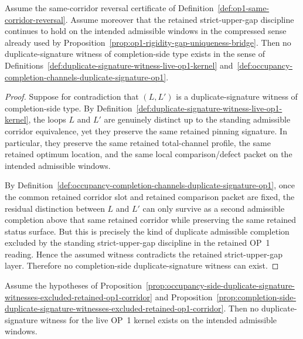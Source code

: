 \begin{proposition}
\label{prop:completion-side-duplicate-signature-witnesses-excluded-retained-op1-corridor}
Assume the same-corridor reversal certificate of Definition~\ref{def:op1-same-corridor-reversal}. Assume moreover that the retained strict-upper-gap discipline continues to hold on the intended admissible windows in the compressed sense already used by Proposition~\ref{prop:op1-rigidity-gap-uniqueness-bridge}. Then no duplicate-signature witness of completion-side type exists in the sense of Definitions~\ref{def:duplicate-signature-witness-live-op1-kernel} and~\ref{def:occupancy-completion-channels-duplicate-signature-op1}.
\end{proposition}

\begin{proof}
Suppose for contradiction that \((L,L')\) is a duplicate-signature witness of completion-side type. By Definition~\ref{def:duplicate-signature-witness-live-op1-kernel}, the loops \(L\) and \(L'\) are genuinely distinct up to the standing admissible corridor equivalence, yet they preserve the same retained pinning signature. In particular, they preserve the same retained total-channel profile, the same retained optimum location, and the same local comparison/defect packet on the intended admissible windows.

By Definition~\ref{def:occupancy-completion-channels-duplicate-signature-op1}, once the common retained corridor slot and retained comparison packet are fixed, the residual distinction between \(L\) and \(L'\) can only survive as a second admissible completion above that same retained corridor while preserving the same retained status surface. But this is precisely the kind of duplicate admissible completion excluded by the standing strict-upper-gap discipline in the retained OP~1 reading. Hence the assumed witness contradicts the retained strict-upper-gap layer. Therefore no completion-side duplicate-signature witness can exist.
\end{proof}

\begin{corollary}
\label{cor:no-duplicate-signature-witness-survives-retained-op1-kernel}
Assume the hypotheses of Proposition~\ref{prop:occupancy-side-duplicate-signature-witnesses-excluded-retained-op1-corridor} and Proposition~\ref{prop:completion-side-duplicate-signature-witnesses-excluded-retained-op1-corridor}. Then no duplicate-signature witness for the live OP~1 kernel exists on the intended admissible windows.
\end{corollary}


